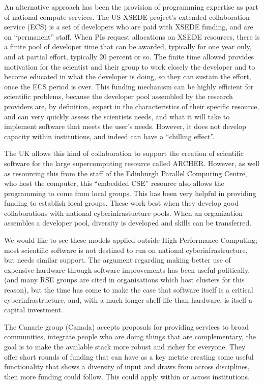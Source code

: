 An alternative approach has been the provision of programming expertise as
part of national compute services. The US XSEDE project's extended collaboration
 service (ECS) is a set of developers who are paid with XSEDE funding,
 and are on “permanent” staff.  When PIs request allocations on XSEDE resources,
 there is a finite pool of developer time that can be awarded,
typically for one year only, and at partial effort, typically 20 percent or so.
The finite time allowed provides motivation for the scientist and their group to
work closely the developer and to become educated in what the developer is doing,
so they can sustain the effort, once the ECS period is over. This funding
mechanism can be highly efficient for scientific problems, because the developer
pool assembled by the research providers are, by definition, expert in the
characteristics of their specific resource, and can very quickly assess the
scientists needs, and what it will take to implement software that meets the
user’s needs. However, it does not develop capacity within institutions,
and indeed can have a ``chilling effect''.

The UK allows this kind of collaboration to support the creation of scientific
software for the large supercomputing resource called ARCHER.
However, as well as resourcing this from the staff of the Edinburgh Parallel
Computing Centre, who host the computer, this ``embedded CSE'' resource also
allows the programming to come from local groups. This has been very helpful
in providing funding to establish local groups. These work best when they
develop good collaborations with national cyberinfrastucture pools.
When an organization assembles
a developer pool, diversity is developed and skills can be transferred.

We would like to see these models applied outside High Performance Computing;
most scientific software is not destined to run on national cyberinfrastructure,
but needs similar support. The argument regarding making better use of expensive
hardware through software improvements has been useful politically, (and many
RSE groups are cited in organisations which host clusters for this reason), but
the time has come to make the case that software itself is a critical
cyberinfrastructure, and, with a much longer shelf-life than hardware, is itself
a capital investment.

The Canarie group (Canada) accepts proposals
for providing services to broad communities, integrate people who are doing
things that are complementary, the goal is to make the available stack more
robust and richer for everyone. They offer short rounds of funding that can
have as a key metric creating some useful functionality that shows a diversity
of input and draws from across disciplines, then more funding could follow. This
could apply within or across institutions.

